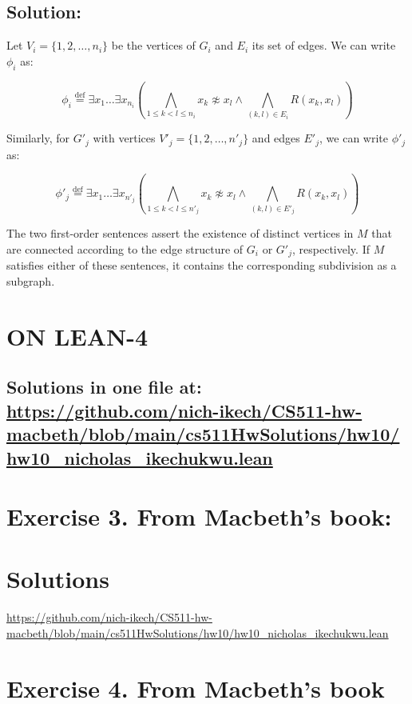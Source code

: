 \documentclass{article}
\begin{document}
\subsection*{Solution:}

Let $V_i = \{1, 2, \ldots, n_i\}$ be the vertices of $G_i$ and $E_i$ its set of edges. We can write $\phi_i$ as:

\[
\phi_i \stackrel{\text{def}}{=} \exists x_1 \ldots \exists x_{n_i} \left(
    \bigwedge_{1 \leq k < l \leq n_i} x_k \not\approx x_l \land
    \bigwedge_{(k,l) \in E_i} R(x_k, x_l)
\right)
\]

Similarly, for $G'_j$ with vertices $V'_j = \{1, 2, \ldots, n'_j\}$ and edges $E'_j$, we can write $\phi'_j$ as:

\[
\phi'_j \stackrel{\text{def}}{=} \exists x_1 \ldots \exists x_{n'_j} \left(
    \bigwedge_{1 \leq k < l \leq n'_j} x_k \not\approx x_l \land
    \bigwedge_{(k,l) \in E'_j} R(x_k, x_l)
\right)
\]

The two first-order sentences assert the existence of distinct vertices in $M$ that are connected according to the edge structure of $G_i$ or $G'_j$, respectively. If $M$ satisfies either of these sentences, it contains the corresponding subdivision as a subgraph.

\newpage



\section*{ON LEAN-4}
\subsection*{Solutions in one file at: 
\url{https://github.com/nich-ikech/CS511-hw-macbeth/blob/main/cs511HwSolutions/hw10/hw10_nicholas_ikechukwu.lean}}

\newpage

\section*{Exercise 3. From Macbeth’s book:}
\section*{Solutions}
\url{https://github.com/nich-ikech/CS511-hw-macbeth/blob/main/cs511HwSolutions/hw10/hw10_nicholas_ikechukwu.lean}

\newpage

\section*{Exercise 4. From Macbeth's book}
\end{document}
